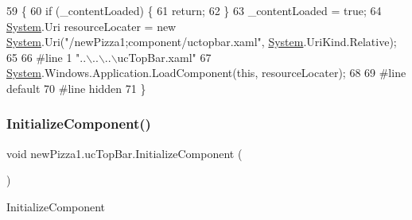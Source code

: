 \begin{DoxyCode}
59                                           \{
60             \textcolor{keywordflow}{if} (\_contentLoaded) \{
61                 \textcolor{keywordflow}{return};
62             \}
63             \_contentLoaded = \textcolor{keyword}{true};
64             \hyperlink{namespaceSystem}{System}.Uri resourceLocater = \textcolor{keyword}{new} \hyperlink{namespaceSystem}{System}.Uri(\textcolor{stringliteral}{"/newPizza1;component/uctopbar.xaml"}, 
      \hyperlink{namespaceSystem}{System}.UriKind.Relative);
65             
66 \textcolor{preprocessor}{            #line 1 "..\(\backslash\)..\(\backslash\)..\(\backslash\)ucTopBar.xaml"}
67             \hyperlink{namespaceSystem}{System}.Windows.Application.LoadComponent(\textcolor{keyword}{this}, resourceLocater);
68             
69 \textcolor{preprocessor}{            #line default}
70 \textcolor{preprocessor}{            #line hidden}
71         \}
\end{DoxyCode}
\mbox{\label{classnewPizza1_1_1ucTopBar_a667aed93b177538819f27c62e5e88844}} 
\subsubsection{\texorpdfstring{Initialize\+Component()}{InitializeComponent()}\hspace{0.1cm}{\footnotesize\ttfamily [5/6]}}
{\footnotesize\ttfamily void new\+Pizza1.\+uc\+Top\+Bar.\+Initialize\+Component (\begin{DoxyParamCaption}{ }\end{DoxyParamCaption})\hspace{0.3cm}{\ttfamily [inline]}}



Initialize\+Component 


